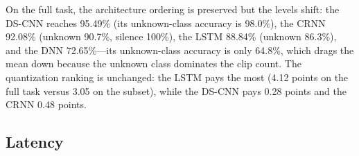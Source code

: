 \documentclass[conference,a4paper]{IEEEtran}
\begin{document}
\begin{table}[t]
\caption{Top-1 accuracy on Speech Commands v2 across the 10-command subset (4{,}074 clips) and the full 12-class task (12{,}005 clips: 4{,}074 commands, 6{,}931 unknown, 1{,}000 silence; protocol in Section~III-D). The fp32 column reports the rebuilt true-float32 DS-CNN and the trained fp32 models in both runtimes; the int8 column is full-int8 TensorFlow Lite (DS-CNN calibrated on 1{,}000 training clips, seed~42). The original mixed-precision DS-CNN artifact scores 90.45\% on the subset and 95.29\% on the full task (95.48\% with float I/O).}
\label{tab:acc}
\centering
{\footnotesize
\setlength{\tabcolsep}{3pt}
}
\end{table}

On the full task, the architecture ordering is preserved but the levels shift: the DS-CNN reaches 95.49\% (its unknown-class accuracy is 98.0\%), the CRNN 92.08\% (unknown 90.7\%, silence 100\%), the LSTM 88.84\% (unknown 86.3\%), and the DNN 72.65\%---its unknown-class accuracy is only 64.8\%, which drags the mean down because the unknown class dominates the clip count. The quantization ranking is unchanged: the LSTM pays the most (4.12 points on the full task versus 3.05 on the subset), while the DS-CNN pays 0.28 points and the CRNN 0.48 points.

\subsection{Latency}
\end{document}
